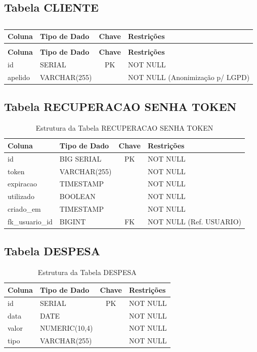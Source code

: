 \documentclass[
	12pt,				%
	openany,			%
	oneside,			%
	a4paper,			%
	english,			%
	french,				%
	spanish,			%
	brazil				%
	]{abntex2}
\begin{document}
\begin{apendicesenv}
\subsection{Tabela CLIENTE}
\begin{longtable}{|l|l|c|p{6cm}|}
    \caption{Estrutura da Tabela CLIENTE} \label{tab:dic_cliente} \\
    \hline \textbf{Coluna} & \textbf{Tipo de Dado} & \textbf{Chave} & \textbf{Restrições} \\ \hline
    \endfirsthead

    \caption{} \label{tab:dic_cliente} \\
    \hline \textbf{Coluna} & \textbf{Tipo de Dado} & \textbf{Chave} & \textbf{Restrições} \\ \hline
    \endhead
    
    id & SERIAL & PK & NOT NULL \\ \hline
    apelido & VARCHAR(255) & & NOT NULL (Anonimização p/ LGPD) \\ \hline
\end{longtable}

\subsection{Tabela RECUPERACAO SENHA TOKEN}
\begin{longtable}{|l|l|c|p{6cm}|}
    \caption{Estrutura da Tabela RECUPERACAO SENHA TOKEN} \label{tab:dic_token} \\
    \hline \textbf{Coluna} & \textbf{Tipo de Dado} & \textbf{Chave} & \textbf{Restrições} \\ \hline
    \endhead
    id & BIG SERIAL & PK & NOT NULL \\ \hline
    token & VARCHAR(255) & & NOT NULL \\ \hline
    expiracao & TIMESTAMP & & NOT NULL \\ \hline
    utilizado & BOOLEAN & & NOT NULL \\ \hline
    criado\_em & TIMESTAMP & & NOT NULL \\ \hline
    fk\_usuario\_id & BIGINT & FK & NOT NULL (Ref. USUARIO) \\ \hline
\end{longtable}

\subsection{Tabela DESPESA}
\begin{longtable}{|l|l|c|p{6cm}|}
    \caption{Estrutura da Tabela DESPESA} \label{tab:dic_despesa} \\
    \hline \textbf{Coluna} & \textbf{Tipo de Dado} & \textbf{Chave} & \textbf{Restrições} \\ \hline
    \endhead
    id & SERIAL & PK & NOT NULL \\ \hline
    data & DATE & & NOT NULL \\ \hline
    valor & NUMERIC(10,4) & & NOT NULL \\ \hline
    tipo & VARCHAR(255) & & NOT NULL \\ \hline
\end{longtable}


\end{apendicesenv}
\end{document}
